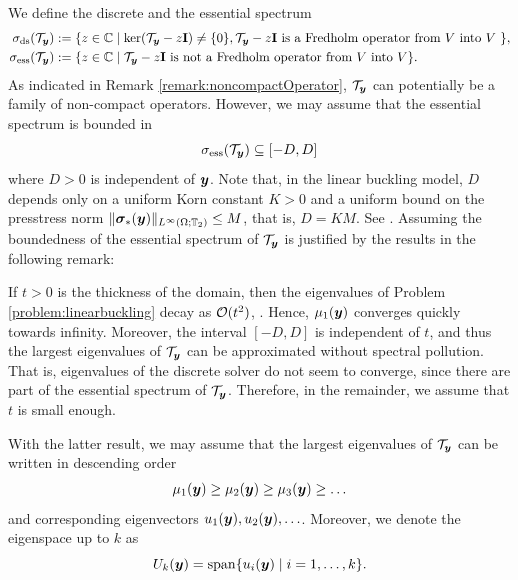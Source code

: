 We define the discrete and the essential spectrum
\begin{align*} 
    \sigma_{\mathrm{ds}}(\mathcal{T}_{\boldsymbol{y}}) &:= \{ z \in \mathbb{C} \mid \ker( \mathcal{T}_{\boldsymbol{y}} - z \mathbf{I}) \neq \{ 0 \},  \mathcal{T}_{\boldsymbol{y}} - z \mathbf{I} \text{ is a Fredholm operator from $V$ into $V$ }  \}, \\
    \sigma_{\mathrm{ess}}(\mathcal{T}_{\boldsymbol{y}}) &:= \{ z \in \mathbb{C} \mid \mathcal{T}_{\boldsymbol{y}} -z \mathbf{I} \text{ is not a Fredholm operator from $V$ into $V$} \}.
    \end{align*}
As indicated in Remark \ref{remark:noncompactOperator}, $\mathcal{T}_{\boldsymbol{y}}$ can potentially be a family of non-compact operators. However, we may assume that the essential spectrum is bounded in 
\begin{equation*}
    \sigma_{\mathrm{ess}}(\mathcal{T}_{\boldsymbol{y}}) \subseteq [-D,D]
\end{equation*}
where $D > 0 $ is independent of ${\boldsymbol{y}}$. Note that, in the linear buckling model, $D$ depends only on a uniform Korn constant $K > 0$ and a uniform bound on the presstress norm $\| \boldsymbol{\sigma}_* ({\boldsymbol{y}}) \|_{L^\infty(\Omega; \mathbb{T}_2)} \leq M $, that is, $D = K M$. See \cite[Theorem 5.1]{DaugeandSuriNumericalapproximation}.
Assuming the boundedness of the essential spectrum of $\mathcal{T}_{\boldsymbol{y}}$ is justified by the results in the following remark:
\begin{lemma}\label{lemma:pollutionfree}
    If $t > 0$ is the thickness of the domain, then the eigenvalues of Problem \ref{problem:linearbuckling} decay as $\mathcal{O}(t^2)$, \cite{dauge:hal-00012083}.  Hence, $ \mu_1({\boldsymbol{y}})$ converges quickly towards infinity.
    Moreover, the interval $[-D,D]$ is independent of $t$, and thus the largest eigenvalues of $\mathcal{T}_{\boldsymbol{y}}$ can be approximated without spectral pollution. That is, eigenvalues of the discrete solver do not seem to converge, since there are part of the essential spectrum of $\mathcal{T}_{\boldsymbol{y}}$.
    Therefore, in the remainder, we assume that $t$ is small enough.
\end{lemma}


With the latter result, we may assume that the largest eigenvalues of $\mathcal{T}_{\boldsymbol{y}}$ can be written in descending order
\begin{align*}
    \mu_1({\boldsymbol{y}}) \geq \mu_2({\boldsymbol{y}}) \geq  \mu_3({\boldsymbol{y}}) \geq \ldots 
\end{align*}
and corresponding eigenvectors $u_1({\boldsymbol{y}}), u_2({\boldsymbol{y}}),\ldots $.
Moreover, we denote the eigenspace up to $k$ as 
\begin{equation}\label{eq:eigenspaceU}
    U_k({\boldsymbol{y}}) = \mathrm{span}\{  u_i({\boldsymbol{y}}) \mid i=1,\ldots,k \} .
\end{equation}




